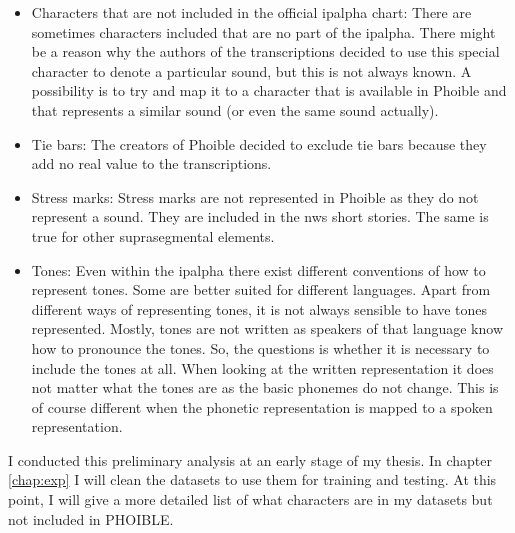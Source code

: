 \begin{itemize}
\item Characters that are not included in the official \ac{ipalpha} chart: There are sometimes characters included that are no part of the \ac{ipalpha}. There might be a reason why the authors of the transcriptions decided to use this special character to denote a particular sound, but this is not always known. A possibility is to try and map it to a character that is available in Phoible and that represents a similar sound (or even the same sound actually). 
\item Tie bars: The creators of Phoible decided to exclude tie bars because they add no real value to the transcriptions.
\item Stress marks: Stress marks are not represented in Phoible as they do not represent a sound. They are included in the \ac{nws} short stories. The same is true for other suprasegmental elements.
\item Tones: Even within the \ac{ipalpha} there exist different conventions of how to represent tones. Some are better suited for different languages. Apart from different ways of representing tones, it is not always sensible to have tones represented. Mostly, tones are not written as speakers of that language know how to pronounce the tones. So, the questions is whether it is necessary to include the tones at all. When looking at the written representation it does not matter what the tones are as the basic phonemes do not change. This is of course different when the phonetic representation is mapped to a spoken representation.
\end{itemize}

I conducted this preliminary analysis at an early stage of my thesis. In chapter \ref{chap:exp} I will clean the datasets to use them for training and testing. At this point, I will give a more detailed list of what characters are in my datasets but not included in PHOIBLE.







